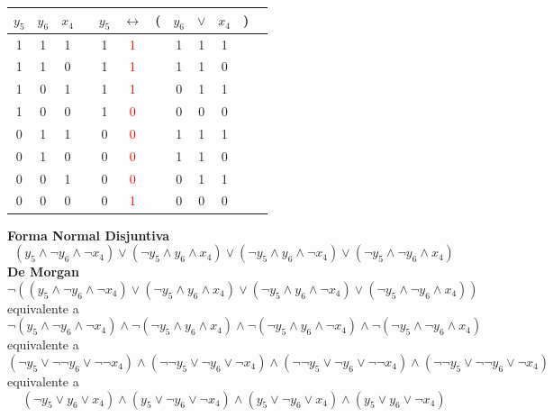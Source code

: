 \documentclass[a4paper]{article}
\begin{document}
\begin{tabular}{@{ }c@{ }@{ }c@{ }@{ }c | c@{ }@{ }c@{ }@{ }c@{ }@{}c@{}@{ }c@{ }@{ }c@{ }@{ }c@{ }@{}c@{}@{ }c}
    \(y_{5}\) & \(y_{6}\) & \(x_{4}\) &  & \(y_{5}\) & $\leftrightarrow$ & ( & \(y_{6}\) & $\lor$ & \(x_{4}\) & ) & \\
    \hline 
    1 & 1 & 1 &  & 1 & \textcolor{red}{1} &  & 1 & 1 & 1 &  & \\
    1 & 1 & 0 &  & 1 & \textcolor{red}{1} &  & 1 & 1 & 0 &  & \\
    1 & 0 & 1 &  & 1 & \textcolor{red}{1} &  & 0 & 1 & 1 &  & \\
    1 & 0 & 0 &  & 1 & \textcolor{red}{0} &  & 0 & 0 & 0 &  & \\
    0 & 1 & 1 &  & 0 & \textcolor{red}{0} &  & 1 & 1 & 1 &  & \\
    0 & 1 & 0 &  & 0 & \textcolor{red}{0} &  & 1 & 1 & 0 &  & \\
    0 & 0 & 1 &  & 0 & \textcolor{red}{0} &  & 0 & 1 & 1 &  & \\
    0 & 0 & 0 &  & 0 & \textcolor{red}{1} &  & 0 & 0 & 0 &  & \\
\end{tabular}
\newline
\textbf{Forma Normal Disjuntiva}
\[
    \left(y_{5} \land \neg y_{6} \land \neg x_{4}\right) \lor \left(\neg y_{5} \land y_{6} \land x_{4}\right) \lor
    \left(\neg y_{5} \land y_{6} \land \neg x_{4} \right) \lor \left(\neg y_{5} \land \neg y_{6} \land x_{4}\right)
\]
\textbf{De Morgan}
\[
    \neg \left(\left(y_{5} \land \neg y_{6} \land \neg x_{4}\right) \lor \left(\neg y_{5} \land y_{6} \land x_{4}\right) \lor
    \left(\neg y_{5} \land y_{6} \land \neg x_{4} \right) \lor \left(\neg y_{5} \land \neg y_{6} \land x_{4}\right)\right)
\]
equivalente a
\[
    \neg \left(y_{5} \land \neg y_{6} \land \neg x_{4}\right) \land \neg \left(\neg y_{5} \land y_{6} \land x_{4}\right) \land
    \neg \left(\neg y_{5} \land y_{6} \land \neg x_{4} \right) \land \neg \left(\neg y_{5} \land \neg y_{6} \land x_{4}\right)
\]
equivalente a
\[
    \left(\neg y_{5} \lor \neg \neg y_{6} \lor \neg \neg x_{4}\right) \land \left(\neg \neg y_{5} \lor \neg y_{6} \lor \neg x_{4}\right) \land
    \left(\neg \neg y_{5} \lor \neg y_{6} \lor \neg \neg x_{4} \right) \land \left(\neg \neg y_{5} \lor \neg \neg y_{6} \lor \neg x_{4}\right)
\]
equivalente a
\[
    \left(\neg y_{5} \lor y_{6} \lor x_{4}\right) \land \left(y_{5} \lor \neg y_{6} \lor \neg x_{4}\right) \land
    \left(y_{5} \lor \neg y_{6} \lor x_{4} \right) \land \left(y_{5} \lor y_{6} \lor \neg x_{4}\right)
\]
\end{document}
